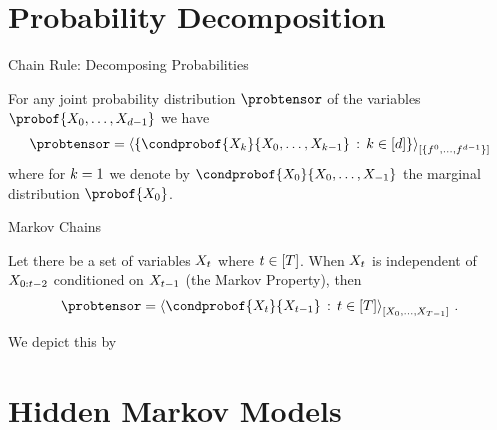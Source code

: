 \documentclass{beamer}
\begin{document}
\section{Probability Decomposition}

\begin{frame}{Chain Rule: Decomposing Probabilities}

    \begin{theorem}\label{the:chainRule}
        For any joint probability distribution $\probtensor$ of the variables $\probof{\catvariableof{0},\ldots,\catvariableof{\atomorder-1}}$ we have
        \begin{align*}
            \probtensor = \contractionof{\{\condprobof{\catvariableof{\atomenumerator}}{\catvariableof{0},\ldots,\catvariableof{\atomenumerator-1}}\, : \, \atomenumeratorin \}}{\{\enumeratedatoms\}}
        \end{align*}
        where for $k=1$ we denote by $ \condprobof{\catvariableof{0}}{\catvariableof{0},\ldots,\catvariableof{-1}}$ the marginal distribution $\probof{\catvariableof{0}}$.
    \end{theorem}

\end{frame}


\begin{frame}{Markov Chains}

    \begin{theorem}\label{the:MarkovChain}
        Let there be a set of variables $X_{t}$ where $t\in[T]$.
        When $X_{t}$ is independent of $X_{0:{t-2}}$ conditioned on $X_{t-1}$ (the Markov Property), then
        \begin{align*}
            \probtensor = \contractionof{\condprobof{\catvariableof{\tenumerator}}{\catvariableof{\tenumerator-1}}\, : \, \tenumeratorin}{
                \catvariableof{0},\ldots,\catvariableof{\tdim-1}
            } \, .
        \end{align*}
    \end{theorem}

    We depict this by
    \begin{center}
        
    \end{center}


\end{frame}


\section{Hidden Markov Models}
\end{document}
